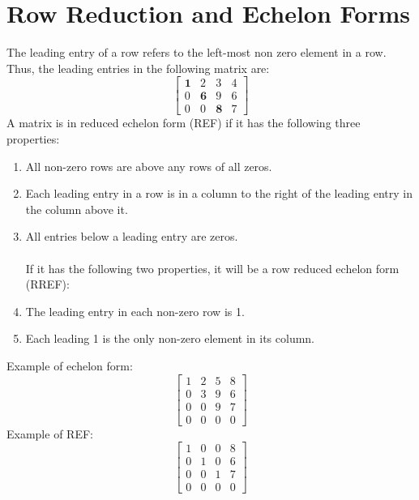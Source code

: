 \documentclass[nobib]{tufte-handout}
\begin{document}
\section{Row Reduction and Echelon Forms}
The leading entry of a row refers to the left-most non zero element in a row. Thus, the leading entries in the following matrix are:
\begin{equation*}
    \begin{bmatrix}
      \textbf{1}& 2 & 3 & 4\\
      0 & \textbf{6} & 9 & 6 \\
      0 & 0 & \textbf{8} & 7
   \end{bmatrix}  
  \end{equation*}
  A matrix is in reduced echelon form (REF) if it has the following three properties:
  \begin{enumerate}
    \item All non-zero rows are above any rows of all zeros.
    \item Each leading entry in a row is in a column to the right of the leading entry in the column above it.
    \item All entries below a leading entry are zeros.\\~\\
    If it has the following two properties, it will be a row reduced echelon form (RREF):
    \item The leading entry in each non-zero row is 1.
    \item Each leading 1 is the only non-zero element in its column.
  \end{enumerate}
  Example of echelon form:
  \begin{equation*}
  \begin{bmatrix}
    1& 2 & 5 & 8\\
    0 & 3 & 9 & 6 \\
    0 & 0 & 9 & 7 \\
    0 & 0 & 0 & 0
 \end{bmatrix}  
\end{equation*}
Example of REF:
\begin{equation*}
    \begin{bmatrix}
      1& 0 & 0 & 8\\
      0 & 1 & 0 & 6 \\
      0 & 0 & 1 & 7 \\
      0 & 0 & 0 & 0
   \end{bmatrix}
  \end{equation*}
\vspace{0.2cm}\\
\end{document}
